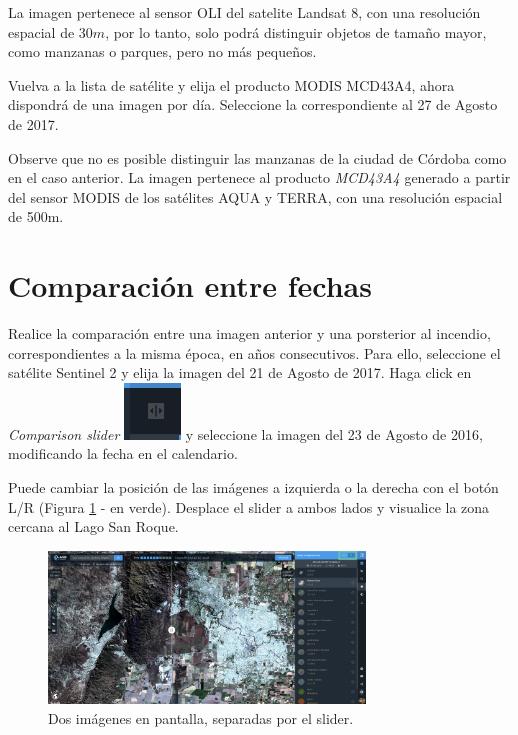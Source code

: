 \documentclass[a4paper,12pt]{book}
\begin{document}
La imagen pertenece al sensor OLI del satelite Landsat 8, con una resolución espacial de $30m$, por lo tanto, solo podrá distinguir objetos de tamaño mayor, como manzanas o parques, pero no más pequeños.

Vuelva a la lista de satélite y elija el producto MODIS MCD43A4, ahora dispondrá de una imagen por día. Seleccione la correspondiente al 27 de Agosto de 2017.

Observe que no es posible distinguir las manzanas de la ciudad de Córdoba como en el caso anterior. La imagen pertenece al producto \emph{MCD43A4} generado a partir del sensor MODIS de los satélites AQUA y TERRA, con una resolución espacial de 500m.

\section{Comparación entre fechas}
Realice la comparación entre una imagen anterior y una porsterior al incendio, correspondientes a la misma época, en años consecutivos. Para ello, seleccione el satélite Sentinel 2 y elija la imagen del 21 de Agosto de 2017. Haga click en \emph{Comparison slider} \includegraphics[scale=0.2]{in:LR.png} y seleccione la imagen del 23 de Agosto de 2016, modificando la fecha en el calendario.

Puede cambiar la posición de las imágenes a izquierda o la derecha con el botón L/R (Figura \ref{fig:slider} - en verde). Desplace el slider a ambos lados y visualice la zona cercana al Lago San Roque.

\begin{figure}[h!]
    \centering
    \includegraphics[width=0.75\textwidth]{fig:slider.png}
    \caption{Dos imágenes en pantalla, separadas por el slider.}
    \label{fig:slider}
\end{figure}
\end{document}
